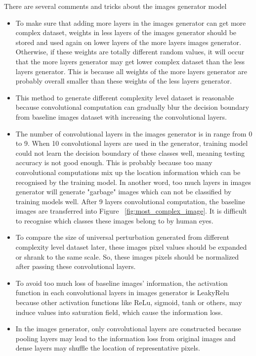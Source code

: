 \documentclass{article}
\begin{document}
There are several comments and tricks about the images generator model
\begin{itemize}
    
    \item To make sure that adding more layers in the images generator can get more complex dataset, weights in less layers of the images generator should be stored and used again on lower layers of the more layers images generator. Otherwise, if these weights are totally different random values, it will occur that the more layers generator may get lower complex dataset than the less layers generator. This is because all weights of the more layers generator are probably overall smaller than these weights of the less layers generator.
    
    \item This method to generate different complexity level dataset is reasonable because convolutional computation can gradually blur the decision boundary from baseline images dataset with increasing the convolutional layers.
    
    \item The number of convolutional layers in the images generator is in range from 0 to 9. When 10 convolutional layers are used in the generator, training model could not learn the decision boundary of these classes well, meaning testing accuracy is not good enough. This is probably because too many convolutional computations mix up the location information which can be recognised by the training model. In another word, too much layers in images generator will generate "garbage" images which can not be classified by training models well. After 9 layers convolutional computation, the baseline images are transferred into Figure~ \ref{fig:most_complex_image}. It is difficult to recognise which classes these images belong to by human eyes.
    
    \item To compare the size of universal perturbation generated from different complexity level dataset later, these images pixel values should be expanded or shrank to the same scale. So, these images pixels should be normalized after passing these convolutional layers.
    
    \item To avoid too much loss of baseline images' information, the activation function in each convolutional layers in images generator is LeakyRelu because other activation functions like ReLu, sigmoid, tanh or others, may induce values into saturation field, which cause the information loss.
    
    \item In the images generator, only convolutional layers are constructed because pooling layers may lead to the information loss from original images and dense layers may shuffle the location of representative pixels.
\end{itemize}
\end{document}
